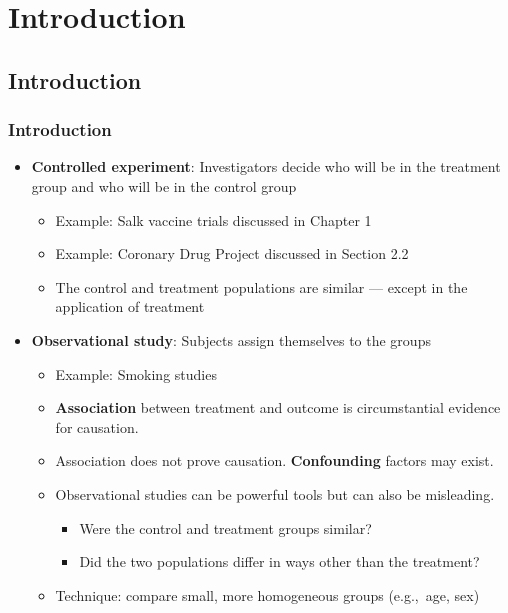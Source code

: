 \documentclass[t,xcolor=pst,dvips]{beamer}
\begin{document}
\addtocounter{page}{-1}
\addtocounter{framenumber}{-1}
\frame{\tableofcontents}

\section{Introduction}
\subsection{Introduction}
\begin{frame}[t]\frametitle{Introduction}
{\small 
\begin{itemize}
\item \textbf{Controlled experiment}: Investigators decide who will be in the treatment group and who will 
  be in the control group
     \begin{itemize}
     \item Example:  Salk vaccine trials discussed in Chapter 1
     \item Example:  Coronary Drug Project discussed in Section 2.2
     \item The control and treatment populations are similar --- except in the application of treatment
     \end{itemize}
\item \textbf{Observational study}: Subjects assign themselves to the groups
     \begin{itemize}
     \item Example:  Smoking studies
     \item \textbf{Association} between treatment and outcome is circumstantial evidence for causation.    
     \item Association does not prove causation.  \textbf{Confounding} factors may exist.
     \item Observational studies can be powerful tools but can also be misleading.%
       \begin{itemize}
         \item Were the control and treatment groups similar?
         \item Did the two populations differ in ways other than the treatment?
       \end{itemize}
     \item Technique:  compare small, more homogeneous groups (e.g.,~age, sex)
     \end{itemize}
\end{itemize}}
\end{frame}
\end{document}
